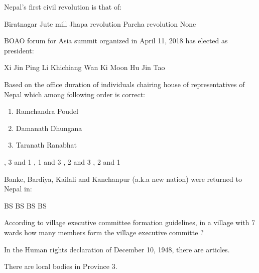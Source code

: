 \begin{questions}
\question Nepal's first civil revolution is that of:
  \begin{choices}
  \CorrectChoice Biratnagar Jute mill
  \choice Jhapa revolution
  \choice Parcha revolution
  \choice None
  \end{choices}

\question BOAO forum for Asia summit organized in April 11, 2018 has elected as president:
  \begin{choices}
  \choice Xi Jin Ping
  \choice Li Khichiang
  \CorrectChoice Wan Ki Moon
  \choice Hu Jin Tao
  \end{choices}

\question Based on the office duration of individuals chairing house of representatives of Nepal which among following order is correct:
  \begin{enumerate}
  \item Ramchandra Poudel
  \item Damanath Dhungana
  \item Taranath Ranabhat
  \end{enumerate}
  \begin{choices}
  , 3 and 1
  , 1 and 3
  , 2 and 3
  , 2 and 1
  \end{choices}

\question Banke, Bardiya, Kailali and Kanchanpur (a.k.a new nation) were returned to Nepal in:
  \begin{choices}
   BS
   BS
   BS
   BS
  \end{choices}

\question According to village executive committee formation guidelines, in a village with 7 wards how many members form the village executive committe ?
  \begin{choices}
  \end{choices}

\question In the Human rights declaration of December 10, 1948, there are \fillin[][2cm] articles.
  \begin{choices}
  \end{choices}

\question There are \fillin[][2cm] local bodies in Province 3.
  \begin{choices}
  \end{choices}


\end{questions}

